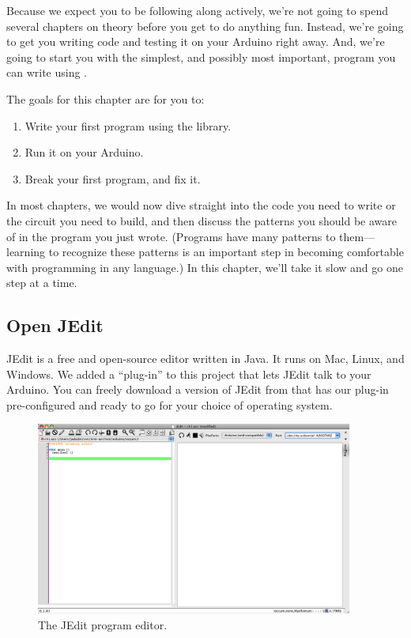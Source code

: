 
Because we expect you to be following along actively, we're not going to spend several chapters on theory before you get to do anything fun. Instead, we're going to get you writing code and testing it on your Arduino right away. And, we're going to start you with the simplest, and possibly most important, program you can write using \plumbing.

\GOALS
The goals for this chapter are for you to:

\begin{enumerate}
	\item Write your first program using the \plumbing library.
	\item Run it on your Arduino.
	\item Break your first program, and fix it.
\end{enumerate}


\CODE
In most chapters, we would now dive straight into the code you need to write or the circuit you need to build, and then discuss the patterns you should be aware of in the program you just wrote. (Programs have many patterns to them---learning to recognize these patterns is an important step in becoming comfortable with programming in any language.) In this chapter, we'll take it slow and go one step at a time.
          
\subsection{Open JEdit}
JEdit is a free and open-source editor written in Java. It runs on Mac, Linux, and Windows. We added a ``plug-in'' to this project that lets JEdit talk to your Arduino. You can freely download a version of JEdit from \ccc that has our plug-in pre-configured and ready to go for your choice of operating system.
      
\begin{figure}[bph]
  \begin{center}
    \includegraphics[height=2.5in]{screenshots/20100108-jedit-docked-occplug}
    \caption{The JEdit program editor.}
    \label{screenshot:jedit-occplug-docked}
  \end{center}
\end{figure}

